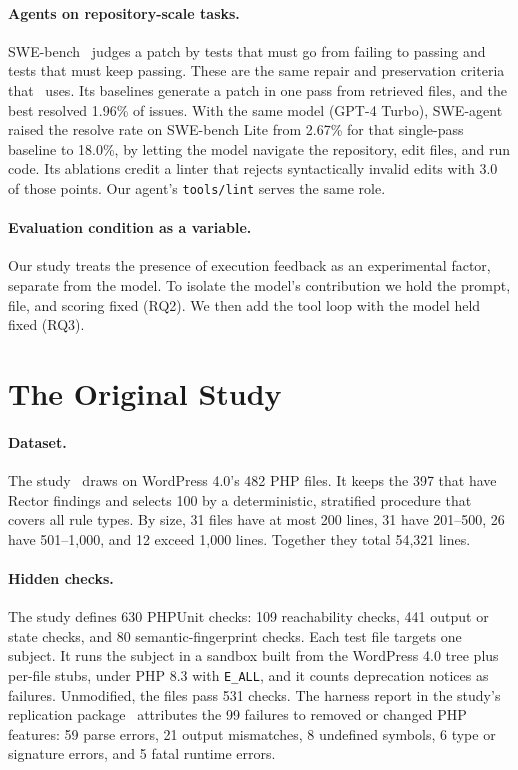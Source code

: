 \documentclass[11pt]{article}
\newcommand{\code}[1]{\texttt{#1}}
\begin{document}
\paragraph{Agents on repository-scale tasks.}
SWE-bench~\cite{jimenez2024swebench} judges a patch by tests that must go from failing to passing and tests that must keep passing.
These are the same repair and preservation criteria that~\cite{mahmud2026modernization} uses.
Its baselines generate a patch in one pass from retrieved files, and the best resolved 1.96\% of issues.
With the same model (GPT-4 Turbo), SWE-agent~\cite{yang2024sweagent} raised the resolve rate on SWE-bench Lite from 2.67\% for that single-pass baseline to 18.0\%, by letting the model navigate the repository, edit files, and run code.
Its ablations credit a linter that rejects syntactically invalid edits with 3.0 of those points.
Our agent's \code{tools/lint} serves the same role.

\paragraph{Evaluation condition as a variable.}
Our study treats the presence of execution feedback as an experimental factor, separate from the model.
To isolate the model's contribution we hold the prompt, file, and scoring fixed (RQ2).
We then add the tool loop with the model held fixed (RQ3).

\section{The Original Study}

\paragraph{Dataset.}
The study~\cite{mahmud2026modernization} draws on WordPress 4.0's 482 PHP files.
It keeps the 397 that have Rector findings and selects 100 by a deterministic, stratified procedure that covers all rule types.
By size, 31 files have at most 200 lines, 31 have 201--500, 26 have 501--1,000, and 12 exceed 1,000 lines.
Together they total 54,321 lines.

\paragraph{Hidden checks.}
The study defines 630 PHPUnit checks: 109 reachability checks, 441 output or state checks, and 80 semantic-fingerprint checks.
Each test file targets one subject.
It runs the subject in a sandbox built from the WordPress 4.0 tree plus per-file stubs, under PHP 8.3 with \code{E\_ALL}, and it counts deprecation notices as failures.
Unmodified, the files pass 531 checks.
The harness report in the study's replication package~\cite{mahmud2026package} attributes the 99 failures to removed or changed PHP features: 59 parse errors, 21 output mismatches, 8 undefined symbols, 6 type or signature errors, and 5 fatal runtime errors.
\end{document}
